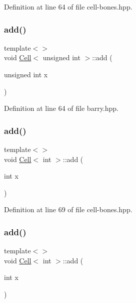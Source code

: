 Definition at line 64 of file cell-\/bones.\+hpp.

\mbox{\label{class_cell_ae22060201cf692bbf219827453d0acd2}} 
\subsubsection{\texorpdfstring{add()}{add()}\hspace{0.1cm}{\footnotesize\ttfamily [5/9]}}
{\footnotesize\ttfamily template$<$$>$ \\
void \hyperlink{class_cell}{Cell}$<$ unsigned int $>$\+::add (\begin{DoxyParamCaption}\item[{unsigned int}]{x }\end{DoxyParamCaption})\hspace{0.3cm}{\ttfamily [inline]}}



Definition at line 64 of file barry.\+hpp.

\mbox{\label{class_cell_a74cb069c7341de33354c396465818c2f}} 
\subsubsection{\texorpdfstring{add()}{add()}\hspace{0.1cm}{\footnotesize\ttfamily [6/9]}}
{\footnotesize\ttfamily template$<$$>$ \\
void \hyperlink{class_cell}{Cell}$<$ int $>$\+::add (\begin{DoxyParamCaption}\item[{int}]{x }\end{DoxyParamCaption})\hspace{0.3cm}{\ttfamily [inline]}}



Definition at line 69 of file cell-\/bones.\+hpp.

\mbox{\label{class_cell_a74cb069c7341de33354c396465818c2f}} 
\subsubsection{\texorpdfstring{add()}{add()}\hspace{0.1cm}{\footnotesize\ttfamily [7/9]}}
{\footnotesize\ttfamily template$<$$>$ \\
void \hyperlink{class_cell}{Cell}$<$ int $>$\+::add (\begin{DoxyParamCaption}\item[{int}]{x }\end{DoxyParamCaption})\hspace{0.3cm}{\ttfamily [inline]}}



